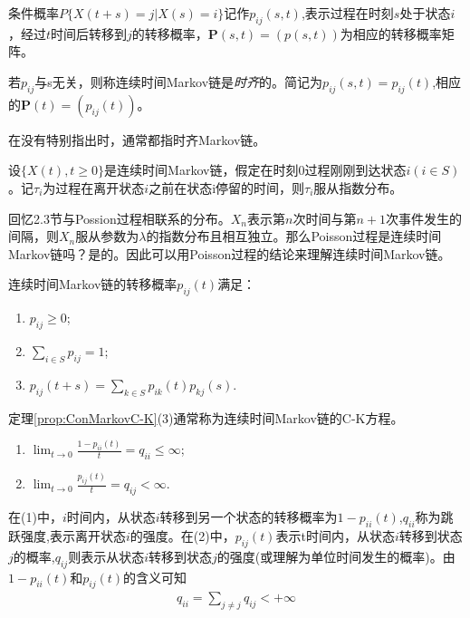 条件概率\(P\{X(t+s)=j|X(s)=i\}\)记作\(p_{ij}(s,t)\),表示过程在时刻\(s\)处于状态\(i\)，经过\(t\)时间后转移到\(j\)的转移概率，\(\mathbf{P}(s,t)=(p(s,t))\)为相应的转移概率矩阵。

\begin{definition}\label{def:TimIndConMarkov}
	若\(p_{ij}\)与s无关，则称连续时间Markov链是\emph{时齐}的。简记为\(p_{ij}(s,t)=p_{ij}(t)\),相应的\(\mathbf{P}(t)=(p_{ij}(t))\)。
\end{definition}

在没有特别指出时，通常都指时齐Markov链。

\begin{theorem}\label{prop:ConMarkovDis}
	设\(\{X(t),t\geqslant 0\}\)是连续时间Markov链，假定在时刻0过程刚刚到达状态\(i(i\in S)\)。记\(\tau_i\)为过程在离开状态\(i\)之前在状态i停留的时间，则\(\tau_i\)服从指数分布。
\end{theorem}

回忆2.3节与Possion过程相联系的分布。\(X_n\)表示第\(n\)次时间与第\(n+1\)次事件发生的间隔，则\(X_n\)服从参数为\(\lambda\)的指数分布且相互独立。那么Poisson过程是连续时间Markov链吗？是的。因此可以用Poisson过程的结论来理解连续时间Markov链。

\begin{theorem}\label{prop:ConMarkovC-K}
	连续时间Markov链的转移概率\(p_{ij}(t)\)满足：
	\begin{enumerate}[\bfseries (1)]
		\item \(p_{ij}\geqslant 0\);
		\item \(\sum_{i\in S}p_{ij}=1\);
		\item \(p_{ij}(t+s)=\sum_{k\in S}p_{ik}(t)p_{kj}(s)\).
	\end{enumerate}
\end{theorem}

定理\ref{prop:ConMarkovC-K}(3)通常称为连续时间Markov链的C-K方程。

\begin{theorem}[跳跃强度]\label{prop:jumpstre}
	\begin{enumerate}[\bfseries (1)]
		\item \(\lim_{t\to 0}\frac{1-p_{ii}(t)}{t}=q_{ii}\leqslant \infty\);

		\item \(\lim_{t\to 0}\frac{p_{ij}(t)}{t}=q_{ij}< \infty\).
	\end{enumerate}
\end{theorem}

在(1)中，\(i\)时间内，从状态\(i\)转移到另一个状态的转移概率为\(1-p_{ii}(t)\),\(q_{ii}\)称为跳跃强度,表示离开状态\(i\)的强度。在(2)中，\(p_{ij}(t)\)表示t时间内，从状态\(i\)转移到状态\(j\)的概率,\(q_{ij}\)则表示从状态\(i\)转移到状态\(j\)的强度(或理解为单位时间发生的概率)。由\(1-p_{ii}(t)\)和\(p_{ij}(t)\)的含义可知
\begin{align*}
	q_{ii}=\sum_{j\neq j}q_{ij}<+\infty
\end{align*}

